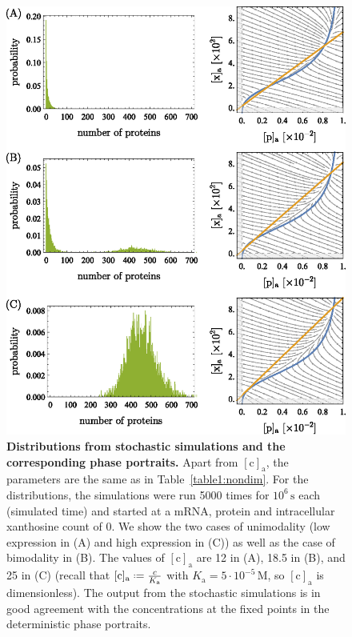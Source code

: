 \documentclass[10pt,letterpaper]{article}
\newcommand{\unit}[1]{\,\mathrm{#1}}
\newcommand{\n}[1]{\mathrm{#1}}
\newcommand*{\defeq}{\mathrel{\vcenter{\baselineskip0.5ex \lineskiplimit0pt
			\hbox{\scriptsize.}\hbox{\scriptsize.}}}%
	=}
\begin{document}
	\begin{figure}%
		\centering
		\includegraphics{media/Fig8_distribution.eps}
		\caption{{\bf Distributions from stochastic simulations and the corresponding phase portraits.}
			Apart from $\n{[c]_a}$, the parameters are the same as in
			Table~\ref{table1:nondim}. For the distributions, the simulations
			were run 5000 times for $10^6 \unit{s}$ each (simulated time) and
			started at a mRNA, protein and intracellular xanthosine count of 0.
			We show the two cases of unimodality (low expression in (A) and high
			expression in (C)) as well as the case of bimodality in (B). The
			values of $\n{[c]_a}$ are 12 in (A), 18.5 in (B), and 25 in (C)
			(recall that $\n{[c]_{a}} \defeq
			\frac{c}{K_{\n{a}}}$ with $K_{\n{a}} = 5 \cdot 10^{-5} \unit{M}$,
			so $\n{[c]_a}$ is dimensionless). The output from the stochastic simulations
			is in good agreement with the concentrations at the fixed points in
			the deterministic phase portraits.}
		\label{fig8:stochC}
	\end{figure}
	
\end{document}
